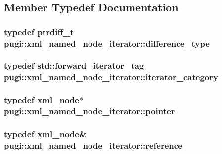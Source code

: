 \subsection{Member Typedef Documentation}
\hypertarget{classpugi_1_1xml__named__node__iterator_a18fa0d610fea4d64271729abc0e28849}{
\subsubsection[{difference\-\_\-type}]{\setlength{\rightskip}{0pt plus 5cm}typedef ptrdiff\-\_\-t {\bf pugi\-::xml\-\_\-named\-\_\-node\-\_\-iterator\-::difference\-\_\-type}}}\label{classpugi_1_1xml__named__node__iterator_a18fa0d610fea4d64271729abc0e28849}
\hypertarget{classpugi_1_1xml__named__node__iterator_a8d3aa9d72f7b79c82f40933b3b0db9cd}{
\subsubsection[{iterator\-\_\-category}]{\setlength{\rightskip}{0pt plus 5cm}typedef std\-::forward\-\_\-iterator\-\_\-tag {\bf pugi\-::xml\-\_\-named\-\_\-node\-\_\-iterator\-::iterator\-\_\-category}}}\label{classpugi_1_1xml__named__node__iterator_a8d3aa9d72f7b79c82f40933b3b0db9cd}
\hypertarget{classpugi_1_1xml__named__node__iterator_aebf72c68ded20cf483a10c6b94aa3f57}{
\subsubsection[{pointer}]{\setlength{\rightskip}{0pt plus 5cm}typedef {\bf xml\-\_\-node}$\ast$ {\bf pugi\-::xml\-\_\-named\-\_\-node\-\_\-iterator\-::pointer}}}\label{classpugi_1_1xml__named__node__iterator_aebf72c68ded20cf483a10c6b94aa3f57}
\hypertarget{classpugi_1_1xml__named__node__iterator_a1c338c7a2aefe04b83f746a963df808b}{
\subsubsection[{reference}]{\setlength{\rightskip}{0pt plus 5cm}typedef {\bf xml\-\_\-node}\& {\bf pugi\-::xml\-\_\-named\-\_\-node\-\_\-iterator\-::reference}}}\label{classpugi_1_1xml__named__node__iterator_a1c338c7a2aefe04b83f746a963df808b}
